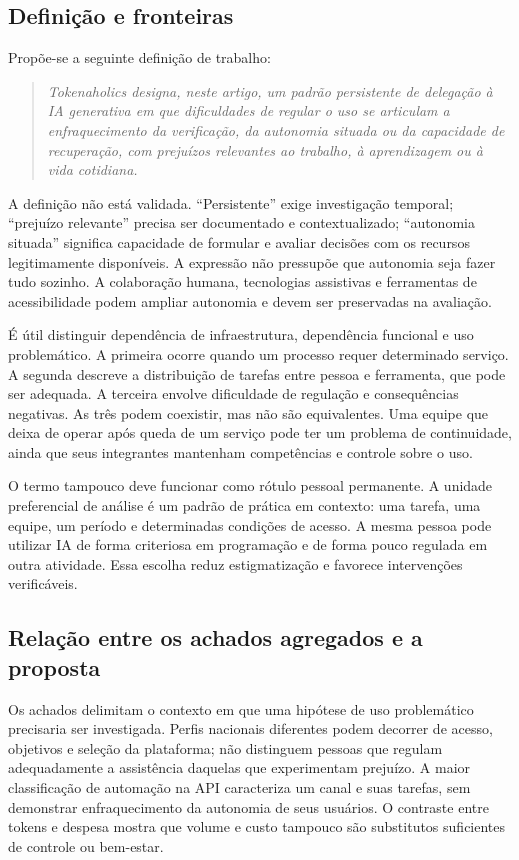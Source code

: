 \documentclass[11pt,a4paper]{article}
\begin{document}
\subsection{Definição e fronteiras}
Propõe-se a seguinte definição de trabalho:
\begin{quote}
\textit{Tokenaholics designa, neste artigo, um padrão persistente de delegação à IA generativa em que dificuldades de regular o uso se articulam a enfraquecimento da verificação, da autonomia situada ou da capacidade de recuperação, com prejuízos relevantes ao trabalho, à aprendizagem ou à vida cotidiana.}
\end{quote}
A definição não está validada. ``Persistente'' exige investigação temporal; ``prejuízo relevante'' precisa ser documentado e contextualizado; ``autonomia situada'' significa capacidade de formular e avaliar decisões com os recursos legitimamente disponíveis. A expressão não pressupõe que autonomia seja fazer tudo sozinho. A colaboração humana, tecnologias assistivas e ferramentas de acessibilidade podem ampliar autonomia e devem ser preservadas na avaliação.

É útil distinguir dependência de infraestrutura, dependência funcional e uso problemático. A primeira ocorre quando um processo requer determinado serviço. A segunda descreve a distribuição de tarefas entre pessoa e ferramenta, que pode ser adequada. A terceira envolve dificuldade de regulação e consequências negativas. As três podem coexistir, mas não são equivalentes. Uma equipe que deixa de operar após queda de um serviço pode ter um problema de continuidade, ainda que seus integrantes mantenham competências e controle sobre o uso.

O termo tampouco deve funcionar como rótulo pessoal permanente. A unidade preferencial de análise é um padrão de prática em contexto: uma tarefa, uma equipe, um período e determinadas condições de acesso. A mesma pessoa pode utilizar IA de forma criteriosa em programação e de forma pouco regulada em outra atividade. Essa escolha reduz estigmatização e favorece intervenções verificáveis.

\subsection{Relação entre os achados agregados e a proposta}
Os achados delimitam o contexto em que uma hipótese de uso problemático precisaria ser investigada. Perfis nacionais diferentes podem decorrer de acesso, objetivos e seleção da plataforma; não distinguem pessoas que regulam adequadamente a assistência daquelas que experimentam prejuízo. A maior classificação de automação na API caracteriza um canal e suas tarefas, sem demonstrar enfraquecimento da autonomia de seus usuários. O contraste entre tokens e despesa mostra que volume e custo tampouco são substitutos suficientes de controle ou bem-estar.
\end{document}
